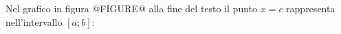 Nel grafico in figura @FIGURE@ alla fine del testo
il punto $x=c$ rappresenta nell’intervallo $[a;b]$:
